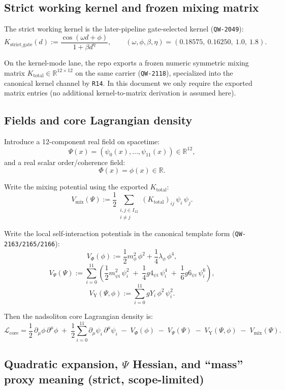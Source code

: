 \documentclass[11pt,a4paper]{article}
\begin{document}
\subsection{Strict working kernel and frozen mixing matrix}

The strict working kernel is the later-pipeline gate-selected kernel (\texttt{QW-2049}):
\[
K_{\mathrm{strict\_gate}}(d)
:=
\frac{\cos(\omega d+\phi)}{1+\beta d^{\eta}},
\qquad
(\omega,\phi,\beta,\eta)=(0.18575,\ 0.16250,\ 1.0,\ 1.8).
\]

On the kernel-mode lane, the repo exports a frozen numeric symmetric mixing matrix $K_{\mathrm{total}}\in\mathbb{R}^{12\times 12}$
on the same carrier (\texttt{QW-2118}), specialized into the canonical kernel channel by \texttt{R14}.
In this document we only require the exported matrix entries (no additional kernel-to-matrix derivation is assumed here).

\subsection{Fields and core Lagrangian density}

Introduce a 12-component real field on spacetime:
\[
\Psi(x)=(\psi_0(x),\dots,\psi_{11}(x))\in\mathbb{R}^{12},
\]
and a real scalar order/coherence field:
\[
\Phi(x)=\phi(x)\in\mathbb{R}.
\]

Write the mixing potential using the exported $K_{\mathrm{total}}$:
\[
V_{\mathrm{mix}}(\Psi)
:=
\frac12 \sum_{\substack{i,j\in I_{12}\\ i\neq j}} (K_{\mathrm{total}})_{ij}\,\psi_i\,\psi_j.
\]

Write the local self-interaction potentials in the canonical template form (\texttt{QW-2163/2165/2166}):
\[
V_{\Phi}(\phi)
:=
\frac12 m_{\phi}^2\,\phi^2 + \frac14 \lambda_{\phi}\,\phi^4,
\]
\[
V_{\Psi}(\Psi)
:=
\sum_{i=0}^{11}\left(
\frac12 m_{\psi i}^2\,\psi_i^2
\;+\;\frac14 g4_{\psi i}\,\psi_i^4
\;+\;\frac16 g6_{\psi i}\,\psi_i^6
\right),
\]
\[
V_{\mathrm{Y}}(\Psi,\phi)
:=
\sum_{i=0}^{11} gY_i\,\phi^2\,\psi_i^2.
\]

Then the nadsoliton core Lagrangian density is:
\[
\mathcal{L}_{\mathrm{core}}
=
\frac12\,\partial_\mu \phi\,\partial^\mu \phi
\;+\;\frac12\sum_{i=0}^{11}\partial_\mu \psi_i\,\partial^\mu \psi_i
\;-\;V_{\Phi}(\phi)
\;-\;V_{\Psi}(\Psi)
\;-\;V_{\mathrm{Y}}(\Psi,\phi)
\;-\;V_{\mathrm{mix}}(\Psi).
\]

\subsection{Quadratic expansion, $\Psi$ Hessian, and “mass” proxy meaning (strict, scope-limited)}
\end{document}
